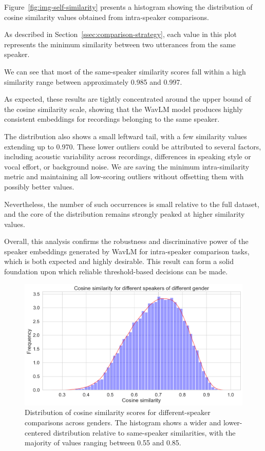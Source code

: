 \documentclass[conference]{IEEEtran}
\begin{document}
Figure~\ref{fig:img-self-similarity} presents a histogram showing the distribution of cosine similarity values obtained from intra-speaker comparisons.

As described in Section~\ref{ssec:comparison-strategy}, each value in this plot represents the minimum similarity between two utterances from the same speaker.

We can see that most of the same-speaker similarity scores fall within a high similarity range between approximately 0.985 and 0.997. 

As expected, these results are tightly concentrated around the upper bound of the cosine similarity scale, showing that the WavLM model produces highly consistent embeddings for recordings belonging to the same speaker. 

The distribution also shows a small leftward tail, with a few similarity values extending up to 0.970. These lower outliers could be attributed to several factors, including acoustic variability across recordings, differences in speaking style or vocal effort, or background noise. We are saving the minimum intra-similarity metric and maintaining all low-scoring outliers without offsetting them with possibly better values.

Nevertheless, the number of such occurrences is small relative to the full dataset, and the core of the distribution remains strongly peaked at higher similarity values.

Overall, this analysis confirms the robustness and discriminative power of the speaker embeddings generated by WavLM for intra-speaker comparison tasks, which is both expected and highly desirable. This result can form a solid foundation upon which reliable threshold-based decisions can be made.


\begin{figure}[H]
	\centering
	\includegraphics[width=0.7\linewidth]{img/img-similarity}
	\caption{Distribution of cosine similarity scores for different-speaker comparisons across genders. The histogram shows a wider and lower-centered distribution relative to same-speaker similarities, with the majority of values ranging between 0.55 and 0.85.}
	\label{fig:img-similarity}
\end{figure}
\end{document}
